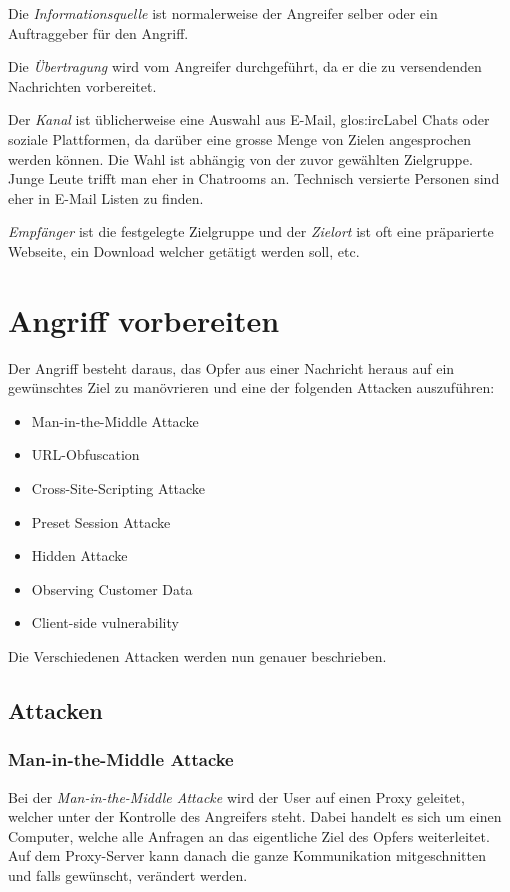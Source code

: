 Die \textit{Informationsquelle} ist normalerweise der Angreifer selber oder ein Auftraggeber für den Angriff.

Die \textit{Übertragung} wird vom Angreifer durchgeführt, da er die zu versendenden Nachrichten vorbereitet.

Der \textit{Kanal} ist üblicherweise eine Auswahl aus E-Mail,  \Gls{glos:ircLabel} Chats oder soziale Plattformen, da darüber eine grosse Menge von Zielen angesprochen werden können. Die Wahl ist abhängig von der zuvor gewählten Zielgruppe. Junge Leute trifft man eher in Chatrooms an. Technisch versierte Personen sind eher in E-Mail Listen zu finden.

\textit{Empfänger} ist die festgelegte Zielgruppe und der \textit{Zielort} ist oft eine präparierte Webseite, ein Download welcher getätigt werden soll, etc.

\section{Angriff vorbereiten}
Der Angriff besteht daraus, das Opfer aus einer Nachricht heraus auf ein gewünschtes Ziel zu manövrieren und eine der folgenden Attacken auszuführen:
\begin{itemize}
\item Man-in-the-Middle Attacke
\item URL-Obfuscation
\item Cross-Site-Scripting Attacke
\item Preset Session Attacke
\item Hidden Attacke
\item Observing Customer Data
\item Client-side vulnerability
\end{itemize}

Die Verschiedenen Attacken werden nun genauer beschrieben.

\subsection{Attacken}
\subsubsection{Man-in-the-Middle Attacke}
Bei der \textit{Man-in-the-Middle Attacke} wird der User auf einen Proxy geleitet, welcher unter der Kontrolle des Angreifers steht. Dabei handelt es sich um einen Computer, welche alle Anfragen an das eigentliche Ziel des Opfers weiterleitet. Auf dem Proxy-Server kann danach die ganze Kommunikation mitgeschnitten und falls gewünscht, verändert werden.

